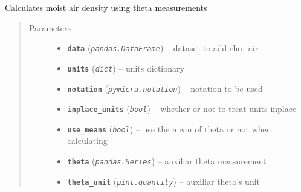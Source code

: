 \documentclass[a4paper,10pt,oneside]{sphinxmanual}
\begin{document}

\begin{fulllineitems}
\label{pymicra:pymicra.physics.airDensity_from_theta}
Calculates moist air density using theta measurements
\begin{quote}\begin{description}
\item[{Parameters}] \leavevmode\begin{itemize}
\item {} 
\textbf{\texttt{data}} (\emph{\texttt{pandas.DataFrame}}) -- dataset to add rho\_air

\item {} 
\textbf{\texttt{units}} (\emph{\texttt{dict}}) -- units dictionary

\item {} 
\textbf{\texttt{notation}} (\emph{\texttt{pymicra.notation}}) -- notation to be used

\item {} 
\textbf{\texttt{inplace\_units}} (\emph{\texttt{bool}}) -- whether or not to treat units inplace

\item {} 
\textbf{\texttt{use\_means}} (\emph{\texttt{bool}}) -- use the mean of theta or not when calculating

\item {} 
\textbf{\texttt{theta}} (\emph{\texttt{pandas.Series}}) -- auxiliar theta measurement

\item {} 
\textbf{\texttt{theta\_unit}} (\emph{\texttt{pint.quantity}}) -- auxiliar theta's unit

\end{itemize}

\end{description}\end{quote}

\end{fulllineitems}

\end{document}
